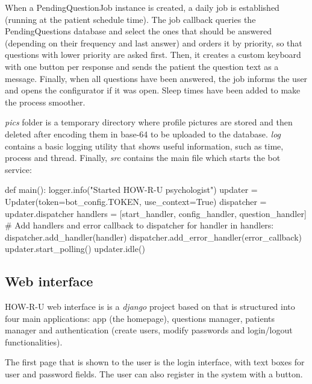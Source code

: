 \documentclass[12pt,english]{article}
\begin{document}
When a PendingQuestionJob instance is created, a daily job is established (running at the patient schedule time). The job callback queries the PendingQuestions database and select the ones that should be answered (depending on their frequency and last answer) and orders it by priority, so that questions with lower priority are asked first. Then, it creates a custom keyboard with one button per response and sends the patient the question text as a message. Finally, when all questions have been answered, the job informs the user and opens the configurator if it was open. Sleep times have been added to make the process smoother.


\emph{pics} folder is a temporary directory where profile pictures are stored and then deleted after encoding them in base-64 to be uploaded to the database. \emph{log} contains a basic logging utility that shows useful information, such as time, process and thread. Finally, \emph{src} contains the main file which starts the bot service:

\begin{python}[caption={Bot file, the one that starts the service}, captionpos=b]
def main():
    logger.info("Started HOW-R-U psychologist")
    updater = Updater(token=bot_config.TOKEN, use_context=True)
    dispatcher = updater.dispatcher
    handlers = [start_handler, config_handler, question_handler]
    # Add handlers and error callback to dispatcher
    for handler in handlers:
        dispatcher.add_handler(handler)
    dispatcher.add_error_handler(error_callback)
    updater.start_polling()
    updater.idle()
\end{python}
\subsection{Web interface}
\label{sec:web_int}

HOW-R-U web interface is is a \emph{django} project based on \cite{appseed} that is structured into four main applications: app (the homepage), questions manager, patients manager and authentication (create users, modify passwords and login/logout functionalities).

The first page that is shown to the user is the login interface, with text boxes for user and password fields. The user can also register in the system with a button.
\end{document}
